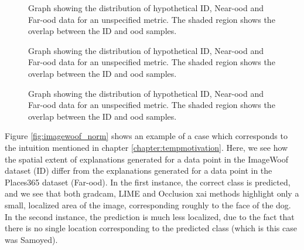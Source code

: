 \documentclass[UKenglish]{uiomasterthesis} %
\theoremstyle{definition}
\begin{document}
\begin{figure}
    \label{fig:gradcam}
    \begin{center}
        
    \end{center}
    \caption[Hypothetical ID/\ac{ood} distributions for an \ac{ood} detection metric]{Graph showing the distribution of hypothetical ID, Near-\ac{ood} and Far-\ac{ood} data for an unspecified metric. The shaded region shows the overlap between the ID and \ac{ood} samples.}
\end{figure}

\begin{figure}
    \label{fig:gradcam}
    \begin{center}
        
    \end{center}
    \caption[Hypothetical ID/\ac{ood} distributions for an \ac{ood} detection metric]{Graph showing the distribution of hypothetical ID, Near-\ac{ood} and Far-\ac{ood} data for an unspecified metric. The shaded region shows the overlap between the ID and \ac{ood} samples.}
\end{figure}

\begin{figure}
    \label{fig:lime}
    \begin{center}
        
    \end{center}
    \caption[Hypothetical ID/\ac{ood} distributions for an \ac{ood} detection metric]{Graph showing the distribution of hypothetical ID, Near-\ac{ood} and Far-\ac{ood} data for an unspecified metric. The shaded region shows the overlap between the ID and \ac{ood} samples.}
\end{figure}


Figure \ref{fig:imagewoof_norm} shows an example of a case which corresponds to the intuition mentioned in chapter \ref{chapter:tempmotivation}. Here, we see how the spatial extent of explanations generated for a data point in the ImageWoof dataset (ID) differ from the explanations generated for a data point in the Places365 dataset (Far-\ac{ood}). In the first instance, the correct class is predicted, and we see that both \ac{gradcam}, LIME and Occlusion \ac{xai} methods highlight only a small, localized area of the image, corresponding roughly to the face of the dog. In the second instance, the prediction is much less localized, due to the fact that there is no single location corresponding to the predicted class (which is this case was Samoyed).
\end{document}
